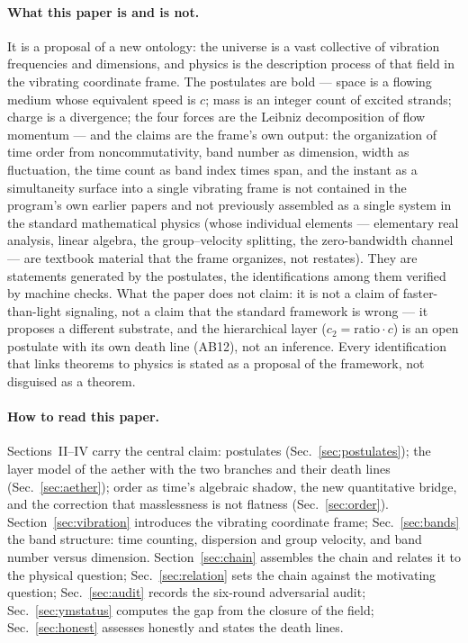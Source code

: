 \documentclass[aps,prd,preprint,superscriptaddress,amsmath,amssymb]{revtex4-2}
\begin{document}
\paragraph{What this paper is and is not.}
It is a proposal of a new ontology: the universe is a vast collective
of vibration frequencies and dimensions, and physics is the
description process of that field in the vibrating coordinate frame.
The postulates are bold \cite{liu2026cosmic,liu2026yangmills} --- space is a flowing medium whose equivalent
speed is $c$; mass is an integer count of excited strands; charge is a
divergence; the four forces are the Leibniz decomposition of flow
momentum --- and the claims are the frame's own output: the
organization of time order from noncommutativity, band number as
dimension, width as fluctuation, the time count as band index times
span, and the instant as a simultaneity surface into a single
vibrating frame is not contained in the program's own earlier papers
and not previously assembled as a single system in the standard
mathematical physics (whose individual elements --- elementary real
analysis, linear
algebra, the group--velocity splitting, the zero-bandwidth channel ---
are textbook material that the frame organizes, not restates).  They
are statements generated by the postulates, the identifications among
them verified by machine checks.  What the paper does not claim: it is not a claim of
faster-than-light signaling, not a claim that the standard framework
is wrong --- it proposes a different substrate, and the hierarchical
layer ($c_2=\mathrm{ratio}\cdot c$) is an open postulate with its own
death line (AB12), not an inference.  Every identification that links
theorems to physics is stated as a proposal of the framework, not
disguised as a theorem.

\paragraph{How to read this paper.}
Sections~II--IV carry the central claim: postulates (Sec.~\ref{sec:postulates}); the
layer model of the aether with the two branches and their death lines
(Sec.~\ref{sec:aether}); order as time's algebraic shadow, the new quantitative
bridge, and the correction that masslessness is not flatness
(Sec.~\ref{sec:order}).  Section~\ref{sec:vibration} introduces the vibrating coordinate frame;
Sec.~\ref{sec:bands} the band structure: time counting, dispersion and group
velocity, and band number versus dimension.  Section~\ref{sec:chain} assembles the
chain and relates it to the physical question; Sec.~\ref{sec:relation} sets the
chain against the motivating question; Sec.~\ref{sec:audit} records the six-round
adversarial audit; Sec.~\ref{sec:ymstatus} computes the gap from the closure of the field;
Sec.~\ref{sec:honest} assesses honestly and
states the death lines.
\end{document}
